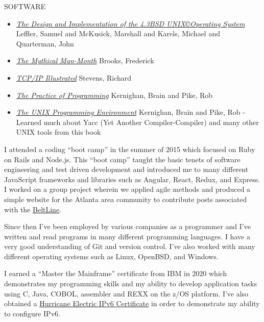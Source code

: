 \documentclass[12pt]{report}
\begin{document}
SOFTWARE
\begin{itemize}
        \item \href{https://archive.org/details/designimplementa0000unse}{\emph {The Design and Implementation of the 4.3BSD UNIX\copyright Operating System}} Leffler, Samuel and McKusick, Marshall and Karels, Michael and Quarterman, John
        \item \href{https://en.wikipedia.org/wiki/The_Mythical_Man-Month}{\emph {The Mythical Man-Month}} Brooks, Frederick
        \item \href{https://en.wikipedia.org/wiki/TCP/IP_Illustrated}{\emph {TCP/IP Illustrated}} Stevens, Richard
        \item \href{https://en.wikipedia.org/wiki/The_Practice_of_Programming}{\emph {The Practice of Programming}} Kernighan, Brain and Pike, Rob
        \item \href{https://en.wikipedia.org/wiki/The_Unix_Programming_Environment}{\emph {The UNIX Programming Environment}} Kernighan, Brain and Pike, Rob - Learned much about Yacc (Yet Another Compiler-Compiler) and many other UNIX tools from this book
\end{itemize}
I attended a coding ``boot camp'' in the summer of 2015 which focused on Ruby on Rails and Node.js. This ``boot camp'' taught the basic tenets of software engineering and test driven development and introduced me to many different JavaScript frameworks and libraries such as Angular, React, Redux, and Express. I worked on a group project wherein we applied agile methods and produced a simple website for the Atlanta area community to contribute posts associated with the \href{https://en.wikipedia.org/wiki/BeltLine}{BeltLine}.

Since then I've been employed by various companies as a programmer and I've written and read programs in many different programming languages. I have a very good understanding of Git and version control. I've also worked with many different operating systems such as Linux, OpenBSD, and Windows.\hfill \break 

I earned a ``Master the Mainframe'' certificate from IBM in 2020 which demonstrates my programming skills and my ability to develop application tasks using C, Java, COBOL, assembler and REXX on the z/OS platform. I've also obtained a \href{https://ipv6.he.net/certification/}{Hurricane Electric IPv6 Certificate} in order to demonstrate my ability to configure IPv6.\hfill \break
\end{document}
